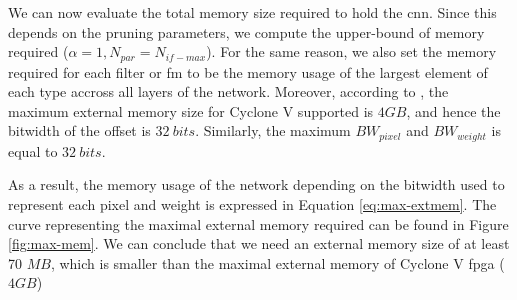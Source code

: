We can now evaluate the total memory size required to hold the \acrshort{cnn}. Since this depends on the pruning parameters, we compute the upper-bound of memory required ($\alpha = 1, N_{par} = N_{if-max}$). For the same reason, we also set the memory required for each filter or \acrshort{fm} to be the memory usage of the largest element of each type accross all layers of the network. Moreover, according to \cite{noauthor_cyclone_2018}, the maximum external memory size for Cyclone V supported is $4GB$, and hence the bitwidth of the offset is $32 \ bits$. Similarly, the maximum $BW_{pixel}$ and $BW_{weight}$ is equal to $32 \ bits$.

As a result, the memory usage of the network depending on the bitwidth used to represent each pixel and weight is expressed in Equation \eqref{eq:max-extmem}.
The curve representing the maximal external memory required can be found in Figure \ref{fig:max-mem}. We can conclude that we need an external memory size of at least 70 $MB$, which is smaller than the maximal external memory of Cyclone V \acrshort{fpga} ($4 GB$)

